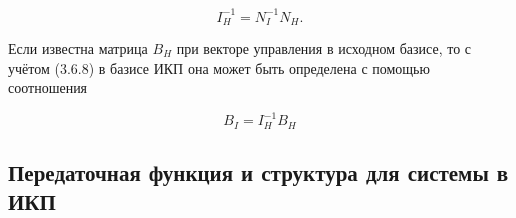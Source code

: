 \begin{equation}
	I_H^{-1}=N_I^{-1}N_H.
\end{equation}

Если известна матрица $B_H$ при векторе управления в исходном базисе, то с учётом (3.6.8)  в базисе ИКП она может быть определена с помощью соотношения

\begin{equation}
	B_I=I_H^{-1}B_H
\end{equation}

\subsection{Передаточная функция и структура для системы в ИКП}